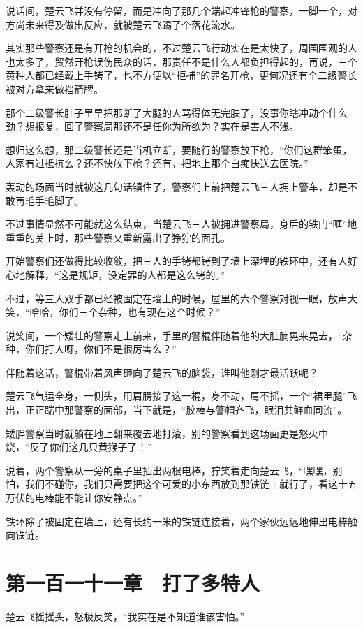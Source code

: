 说话间，楚云飞并没有停留，而是冲向了那几个端起冲锋枪的警察，一脚一个，对方尚未来得及做出反应，就被楚云飞踢了个落花流水。

其实那些警察还是有开枪的机会的，不过楚云飞行动实在是太快了，周围围观的人也太多了，贸然开枪误伤民众的话，那责任不是什么人都负担得起的，再说，三个黄种人都已经戴上手铐了，也不方便以“拒捕”的罪名开枪，更何况还有个二级警长被对方拿来做挡箭牌。

那个二级警长肚子里早把那断了大腿的人骂得体无完肤了，没事你瞎冲动个什么劲？想报复，回了警察局那还不是任你为所欲为？实在是害人不浅。

想归这么想，那二级警长还是当机立断，要随行的警察放下枪，“你们这群笨蛋，人家有过抵抗么？还不快放下枪？还有，把地上那个白痴快送去医院。”

轰动的场面当时就被这几句话镇住了，警察们上前把楚云飞三人拥上警车，却是不敢再毛手毛脚了。

不过事情显然不可能就这么结束，当楚云飞三人被拥进警察局，身后的铁门“哐”地重重的关上时，那些警察又重新露出了狰狞的面孔。

开始警察们还做得比较收敛，把三人的手铐都铐到了墙上深埋的铁环中，还有人好心地解释，“这是规矩，没定罪的人都是这么铐的。”

不过，等三人双手都已经被固定在墙上的时候，屋里的六个警察对视一眼，放声大笑，“哈哈，你们三个杂种，也有现在这个时候？”

说笑间，一个矮壮的警察走上前来，手里的警棍伴随着他的大肚腩晃来晃去，“杂种，你们打人呀，你们不是很厉害么？”

伴随着这话，警棍带着风声砸向了楚云飞的脑袋，谁叫他刚才最活跃呢？

楚云飞气运全身，一侧头，用肩膀接了这一棍，身不动，肩不摇，一个“裙里腿”飞出，正正踹中那警察的面部，当下就是，“胶棒与警帽齐飞，眼泪共鲜血同流”。

矮胖警察当时就躺在地上翻来覆去地打滚，别的警察看到这场面更是怒火中烧，“反了你们这几只黄猴子了！”

说着，两个警察从一旁的桌子里抽出两根电棒，狞笑着走向楚云飞，“嘿嘿，别怕，我们不碰你，我们只需要把这个可爱的小东西放到那铁链上就行了，看这十五万伏的电棒能不能让你安静点。”

铁环除了被固定在墙上，还有长约一米的铁链连接着，两个家伙远远地伸出电棒触向铁链。

\section{第一百一十一章　打了多特人}

楚云飞摇摇头，怒极反笑，“我实在是不知道谁该害怕。”

